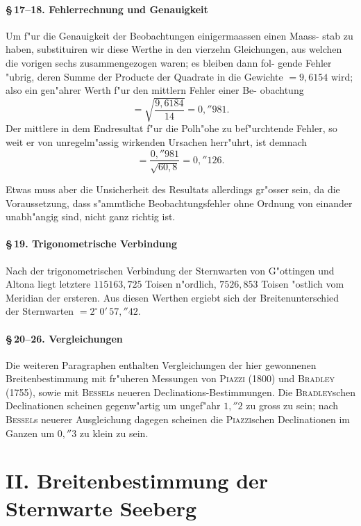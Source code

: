 \documentclass[12pt,a4paper]{article}
\theoremstyle{plain}
\theoremstyle{definition}
\theoremstyle{remark}
\begin{document}
\subsection*{\S\,17--18. Fehlerrechnung und Genauigkeit}

Um f"ur die Genauigkeit der Beobachtungen einigermaassen einen Maass-
stab zu haben, substituiren wir diese Werthe in den vierzehn Gleichungen,
aus welchen die vorigen sechs zusammengezogen waren; es bleiben dann fol-
gende Fehler "ubrig, deren Summe der Producte der Quadrate in die Gewichte
$= 9{,}6154$ wird; also ein gen"ahrer Werth f"ur den mittlern Fehler einer Be-
obachtung
\[
= \sqrt{\frac{9{,}6184}{14}} = 0{,}''981.
\]
Der mittlere in dem Endresultat f"ur die Polh"ohe zu bef"urchtende Fehler,
so weit er von unregelm"assig wirkenden Ursachen herr"uhrt, ist demnach
\[
= \frac{0{,}''981}{\sqrt{60{,}8}} = 0{,}''126.
\]

Etwas muss aber die Unsicherheit des Resultats allerdings gr"osser sein,
da die Voraussetzung, dass s"ammtliche Beobachtungsfehler ohne Ordnung von
einander unabh"angig sind, nicht ganz richtig ist.

\subsection*{\S\,19. Trigonometrische Verbindung}

Nach der trigonometrischen Verbindung der Sternwarten von G"ottingen
und Altona liegt letztere $115163{,}725$ Toisen n"ordlich, $7526{,}853$ Toisen
"ostlich vom Meridian der ersteren. Aus diesen Werthen ergiebt sich der
Breitenunterschied der Sternwarten $= 2^{\circ}\,0'\,57{,}''42$.

\subsection*{\S\,20--26. Vergleichungen}

Die weiteren Paragraphen enthalten Vergleichungen der hier gewonnenen
Breitenbestimmung mit fr"uheren Messungen von \textsc{Piazzi} (1800) und
\textsc{Bradley} (1755), sowie mit \textsc{Bessel}s neueren
Declinations-Bestimmungen. Die \textsc{Bradley}schen Declinationen
scheinen gegenw"artig um ungef"ahr $1{,}''2$ zu gross zu sein; nach
\textsc{Bessel}s neuerer Ausgleichung dagegen scheinen die
\textsc{Piazzi}schen Declinationen im Ganzen um $0{,}''3$ zu klein zu sein.

\newpage

\part*{II. Breitenbestimmung der Sternwarte Seeberg}
\end{document}
